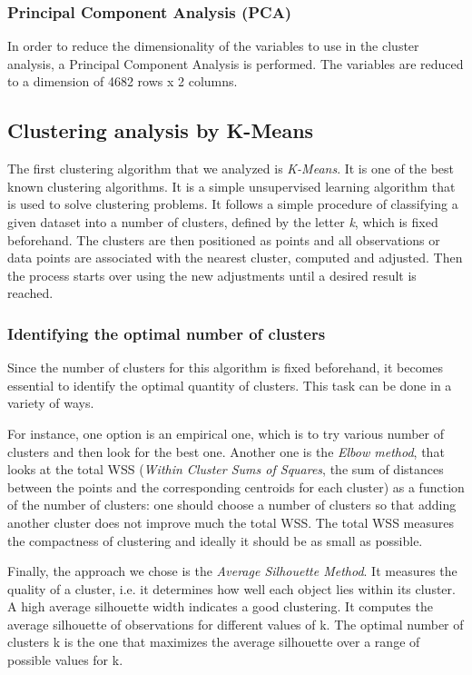 \documentclass[a4paper,11pt,dvipsnames]{article}
\begin{document}
\subsubsection{Principal Component Analysis (PCA)}

In order to reduce the dimensionality of the variables to use in the cluster analysis, a Principal Component Analysis is performed. The variables are reduced to a dimension of 4682 rows x 2 columns.

\subsection{Clustering analysis by K-Means}
The first clustering algorithm that we analyzed is \textit{K-Means}. It is one of the best known clustering algorithms. It is a simple unsupervised learning algorithm that is used to solve clustering problems. It follows a simple procedure of classifying a given dataset into a number of clusters, defined by the letter \textit{k}, which is fixed beforehand. The clusters are then positioned as points and all observations or data points are associated with the nearest cluster, computed and adjusted. Then the process starts over using the new adjustments until a desired result is reached.

\subsubsection{Identifying the optimal number of clusters}
Since the number of clusters for this algorithm is fixed beforehand, it becomes essential to identify the optimal quantity of clusters. This task can be done in a variety of ways.

For instance, one option is an empirical one, which is to try various number of clusters and then look for the best one. Another one is the \textit{Elbow method}, that looks at the total WSS (\textit{Within Cluster Sums of Squares}, the sum of distances between the points and the corresponding centroids for each cluster) as a function of the number of clusters: one should choose a number of clusters so that adding another cluster does not improve much the total WSS. The total WSS measures the compactness of clustering and ideally it should be as small as possible. 

Finally, the approach we chose is the \textit{Average Silhouette Method}. It measures the quality of a cluster, i.e. it determines how well each object lies within its cluster. A high average silhouette width indicates a good clustering. It computes the average silhouette of observations for different values of k. The optimal number of clusters k is the one that maximizes the average silhouette over a range of possible values for k\cite{books/wi/KaufmanR90}.
\end{document}
